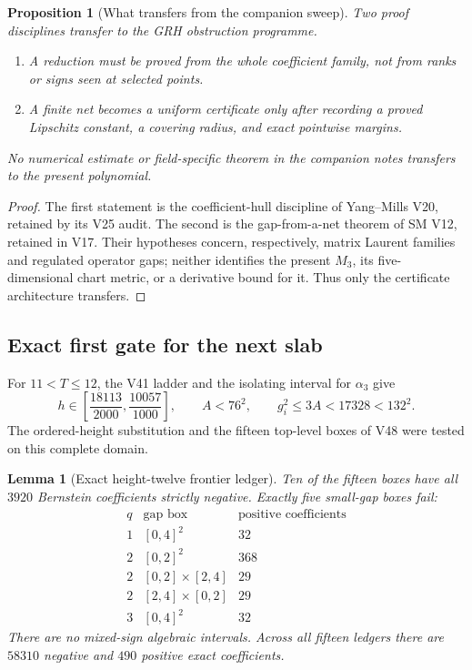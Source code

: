 \documentclass[11pt]{article}
\newtheorem{proposition}[theorem]{Proposition}
\newtheorem{lemma}[theorem]{Lemma}
\theoremstyle{definition}
\theoremstyle{remark}
\begin{document}
\begin{proposition}[What transfers from the companion sweep]
\label{prop:f2v50-transfer}
Two proof disciplines transfer to the GRH obstruction programme.
\begin{enumerate}
\item A reduction must be proved from the whole coefficient family, not
from ranks or signs seen at selected points.
\item A finite net becomes a uniform certificate only after recording a
proved Lipschitz constant, a covering radius, and exact pointwise margins.
\end{enumerate}
No numerical estimate or field-specific theorem in the companion notes
transfers to the present polynomial.
\end{proposition}

\begin{proof}
The first statement is the coefficient-hull discipline of Yang--Mills
V20, retained by its V25 audit.  The second is the gap-from-a-net theorem
of SM V12, retained in V17.  Their hypotheses concern, respectively,
matrix Laurent families and regulated operator gaps; neither identifies
the present \(M_3\), its five-dimensional chart metric, or a derivative
bound for it.  Thus only the certificate architecture transfers.
\end{proof}

\subsection{Exact first gate for the next slab}

For \(11<T\le12\), the V41 ladder and the isolating interval for
\(\alpha_3\) give
\begin{equation}
 h\in\left[\frac{18113}{2000},\frac{10057}{1000}\right],
 \qquad A<76^2,\qquad
 g_i^2\le3A<17328<132^2.
\label{eq:f2v50-domain}
\end{equation}
The ordered-height substitution and the fifteen top-level boxes of V48
were tested on this complete domain.

\begin{lemma}[Exact height-twelve frontier ledger]
\label{lem:f2v50-frontier}
Ten of the fifteen boxes have all \(3920\) Bernstein coefficients
strictly negative.  Exactly five small-gap boxes fail:
\begin{equation}
\begin{array}{c|c|r}
q&\text{gap box}&\text{positive coefficients}\\ \hline
1&[0,4]^2&32\\
2&[0,2]^2&368\\
2&[0,2]\times[2,4]&29\\
2&[2,4]\times[0,2]&29\\
3&[0,4]^2&32
\end{array}
\label{eq:f2v50-failures}
\end{equation}
There are no mixed-sign algebraic intervals.  Across all fifteen ledgers
there are \(58310\) negative and \(490\) positive exact coefficients.
\end{lemma}
\end{document}
